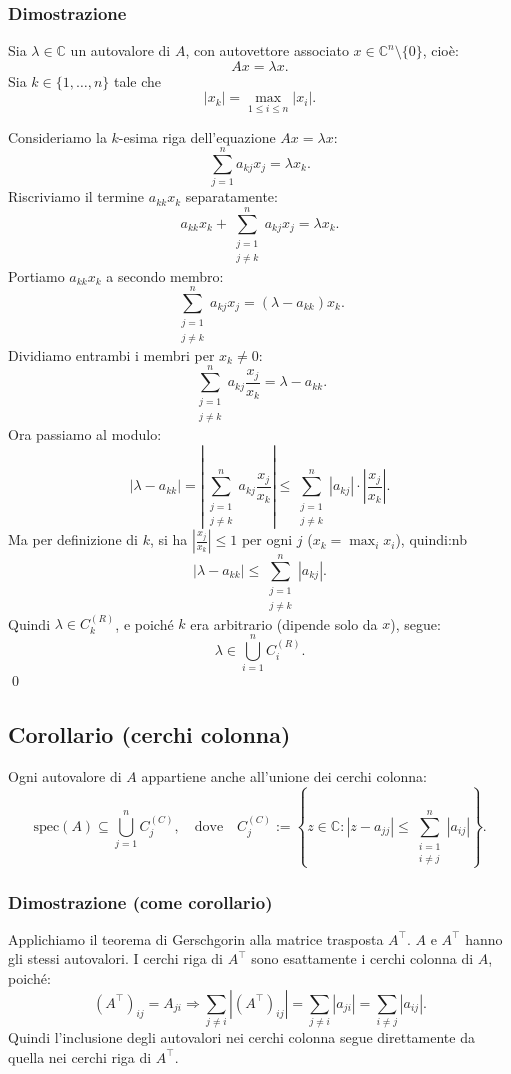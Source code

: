 \documentclass[12pt,a4paper]{article}
\begin{document}
\subsubsection*{Dimostrazione}
Sia \( \lambda \in \mathbb{C} \) un autovalore di \( A \), con autovettore associato \( x \in \mathbb{C}^n \setminus \{0\} \), cioè:
\[
A x = \lambda x.
\]
Sia \( k \in \{1,\dots,n\} \) tale che
\[
|x_k| = \max_{1 \leq i \leq n} |x_i|.
\]

Consideriamo la \( k \)-esima riga dell'equazione \( Ax = \lambda x \):
\[
\sum_{j=1}^n a_{kj} x_j = \lambda x_k.
\]
Riscriviamo il termine \( a_{kk} x_k \) separatamente:
\[
a_{kk} x_k + \sum_{\substack{j=1 \\ j \neq k}}^n a_{kj} x_j = \lambda x_k.
\]
Portiamo \( a_{kk} x_k \) a secondo membro:
\[
\sum_{\substack{j=1 \\ j \neq k}}^n a_{kj} x_j = (\lambda - a_{kk}) x_k.
\]
Dividiamo entrambi i membri per \( x_k \neq 0 \):
\[
\sum_{\substack{j=1 \\ j \neq k}}^n a_{kj} \frac{x_j}{x_k} = \lambda - a_{kk}.
\]
Ora passiamo al modulo:
\[
|\lambda - a_{kk}| = \left| \sum_{\substack{j=1 \\ j \neq k}}^n a_{kj} \frac{x_j}{x_k} \right| \leq \sum_{\substack{j=1 \\ j \neq k}}^n |a_{kj}| \cdot \left| \frac{x_j}{x_k} \right|.
\]
Ma per definizione di \( k \), si ha \( \left| \frac{x_j}{x_k} \right| \leq 1 \) per ogni \( j \) ($x_k = \max_{i} x_i$), quindi:nb
\[
|\lambda - a_{kk}| \leq \sum_{\substack{j=1 \\ j \neq k}}^n |a_{kj}|.
\]
Quindi \( \lambda \in C_k^{(R)} \), e poiché \( k \) era arbitrario (dipende solo da \( x \)), segue:
\[
\lambda \in \bigcup_{i=1}^n C_i^{(R)}.
\]
\qed


\subsection*{Corollario (cerchi colonna)}
Ogni autovalore di \( A \) appartiene anche all’unione dei cerchi colonna:
\[
\mathrm{spec}(A) \subseteq \bigcup_{j=1}^n C_j^{(C)}, \quad \text{dove} \quad 
C_j^{(C)} := \left\{ z \in \mathbb{C} : |z - a_{jj}| \leq \sum_{\substack{i=1\\ i \neq j}}^n |a_{ij}| \right\}.
\]

\subsubsection*{Dimostrazione (come corollario)}
Applichiamo il teorema di Gerschgorin alla matrice trasposta \( A^\top \).  
\( A \) e \( A^\top \) hanno gli stessi autovalori. I cerchi riga di \( A^\top \) sono esattamente i cerchi colonna di \( A \), poiché:
\[
(A^\top)_{ij} = A_{ji} \Rightarrow \sum_{j \neq i} |(A^\top)_{ij}| = \sum_{j \neq i} |a_{ji}| = \sum_{i \neq j} |a_{ij}|.
\]
Quindi l’inclusione degli autovalori nei cerchi colonna segue direttamente da quella nei cerchi riga di \( A^\top \).
\end{document}
